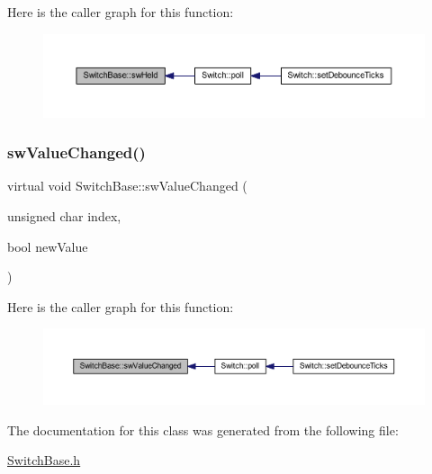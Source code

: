 Here is the caller graph for this function\+:
\nopagebreak
\begin{figure}[H]
\begin{center}
\leavevmode
\includegraphics[width=350pt]{class_switch_base_a074fca26f56e9253ddd86720f7840440_icgraph}
\end{center}
\end{figure}
\mbox{\label{class_switch_base_a8dce83329bd9ce69e55d2f01115f3593}} 
\subsubsection{\texorpdfstring{sw\+Value\+Changed()}{swValueChanged()}}
{\footnotesize\ttfamily virtual void Switch\+Base\+::sw\+Value\+Changed (\begin{DoxyParamCaption}\item[{unsigned char}]{index,  }\item[{bool}]{new\+Value }\end{DoxyParamCaption})\hspace{0.3cm}{\ttfamily [pure virtual]}}

Here is the caller graph for this function\+:
\nopagebreak
\begin{figure}[H]
\begin{center}
\leavevmode
\includegraphics[width=350pt]{class_switch_base_a8dce83329bd9ce69e55d2f01115f3593_icgraph}
\end{center}
\end{figure}


The documentation for this class was generated from the following file\+:\begin{DoxyCompactItemize}
\item 
\hyperlink{_switch_base_8h}{Switch\+Base.\+h}\end{DoxyCompactItemize}
